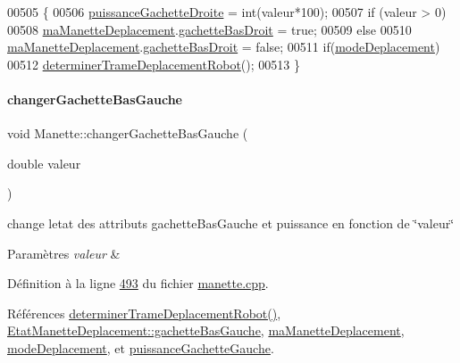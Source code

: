 \begin{DoxyCode}
00505 \{
00506     \hyperlink{class_manette_a135a3a6f567bbeeefd69b3a020f9f040}{puissanceGachetteDroite} = int(valeur*100);
00507     \textcolor{keywordflow}{if} (valeur > 0)
00508         \hyperlink{class_manette_af3d0f304c4c33e02bdf34fc99aa4dbff}{maManetteDeplacement}.\hyperlink{struct_etat_manette_deplacement_a4588620c1e2a3543ce67c9a791aac106}{gachetteBasDroit} = \textcolor{keyword}{true};
00509     \textcolor{keywordflow}{else}
00510         \hyperlink{class_manette_af3d0f304c4c33e02bdf34fc99aa4dbff}{maManetteDeplacement}.\hyperlink{struct_etat_manette_deplacement_a4588620c1e2a3543ce67c9a791aac106}{gachetteBasDroit} = \textcolor{keyword}{false};
00511     \textcolor{keywordflow}{if}(\hyperlink{class_manette_a4dc6231c8cc65fac03f59d323fa9a038}{modeDeplacement})
00512         \hyperlink{class_manette_a97a50caac68954a229c7e9461e7f4232}{determinerTrameDeplacementRobot}();
00513 \}
\end{DoxyCode}
\mbox{\label{class_manette_a858088ed0eb2259fcb2f3df390e950c9}} 
\paragraph{\texorpdfstring{changer\+Gachette\+Bas\+Gauche}{changerGachetteBasGauche}}
{\footnotesize\ttfamily void Manette\+::changer\+Gachette\+Bas\+Gauche (\begin{DoxyParamCaption}\item[{double}]{valeur }\end{DoxyParamCaption})\hspace{0.3cm}{\ttfamily [slot]}}



change l\textquotesingle{}etat des attributs gachette\+Bas\+Gauche et puissance en fonction de \char`\"{}valeur\char`\"{} 


\begin{DoxyParams}{Paramètres}
{\em valeur} & \\
\hline
\end{DoxyParams}


Définition à la ligne \hyperlink{manette_8cpp_source_l00493}{493} du fichier \hyperlink{manette_8cpp_source}{manette.\+cpp}.



Références \hyperlink{manette_8cpp_source_l00341}{determiner\+Trame\+Deplacement\+Robot()}, \hyperlink{manette_8h_source_l00184}{Etat\+Manette\+Deplacement\+::gachette\+Bas\+Gauche}, \hyperlink{manette_8h_source_l00220}{ma\+Manette\+Deplacement}, \hyperlink{manette_8h_source_l00253}{mode\+Deplacement}, et \hyperlink{manette_8h_source_l00256}{puissance\+Gachette\+Gauche}.


